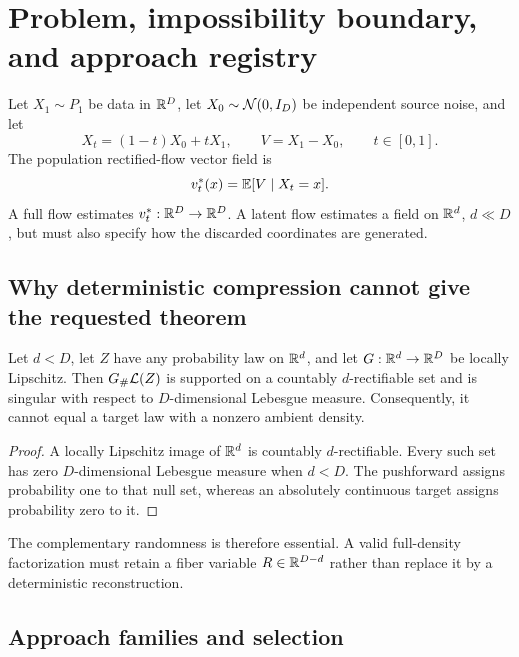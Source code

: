 \section{Problem, impossibility boundary, and approach registry}

Let $X_1\sim P_1$ be data in $\mathbb R^D$, let $X_0\sim\mathcal N(0,I_D)$ be independent source noise, and let
\begin{equation}
  X_t=(1-t)X_0+tX_1,\qquad V=X_1-X_0,\qquad t\in[0,1].
  \label{eq:rectified}
\end{equation}
The population rectified-flow vector field is
\begin{equation}
 v_t^*(x)=\mathbb E[V\mid X_t=x].
 \label{eq:ambient-field}
\end{equation}
A full flow estimates $v_t^*: \mathbb R^D\to\mathbb R^D$.  A latent flow estimates a field on $\mathbb R^d$, $d\ll D$, but must also specify how the discarded coordinates are generated.

\subsection{Why deterministic compression cannot give the requested theorem}

\begin{proposition}
Let $d<D$, let $Z$ have any probability law on $\mathbb R^d$, and let $G:\mathbb R^d\to\mathbb R^D$ be locally Lipschitz.  Then $G_\#\mathcal L(Z)$ is supported on a countably $d$-rectifiable set and is singular with respect to $D$-dimensional Lebesgue measure.  Consequently, it cannot equal a target law with a nonzero ambient density.
\end{proposition}
\begin{proof}
A locally Lipschitz image of $\mathbb R^d$ is countably $d$-rectifiable.  Every such set has zero $D$-dimensional Lebesgue measure when $d<D$.  The pushforward assigns probability one to that null set, whereas an absolutely continuous target assigns probability zero to it.
\end{proof}

The complementary randomness is therefore essential.  A valid full-density factorization must retain a fiber variable $R\in\mathbb R^{D-d}$ rather than replace it by a deterministic reconstruction.

\subsection{Approach families and selection}

